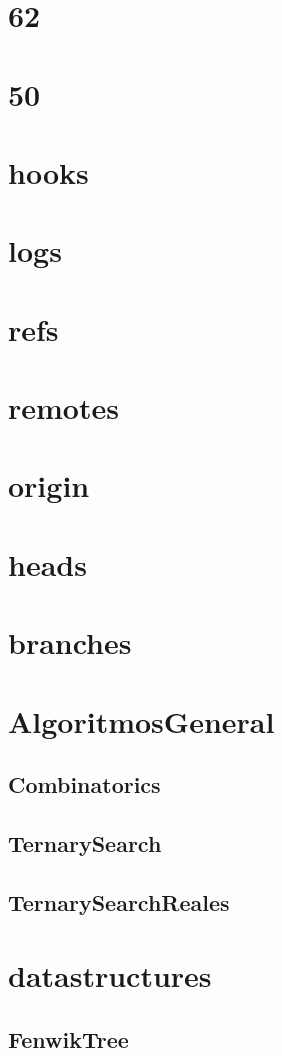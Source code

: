 \documentclass{article}
\begin{document}
\section{62}
\section{50}
\section{hooks}
\section{logs}
\section{refs}
\section{remotes}
\section{origin}
\section{heads}
\section{branches}
\section{AlgoritmosGeneral}
\subsection{Combinatorics}


\subsection{TernarySearch}


\subsection{TernarySearchReales}


\section{datastructures}
\subsection{FenwikTree}

\end{document}
